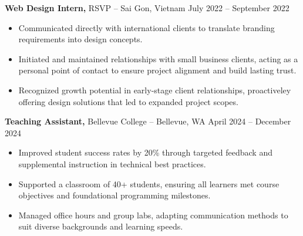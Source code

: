 \documentclass[11pt]{article}       %
\begin{document}
\textbf{Web Design Intern,} {RSVP} -- Sai Gon, Vietnam \hfill July 2022 -- September 2022 \\
\vspace{-9pt}
\begin{itemize}
  \item Communicated directly with international clients to translate branding requirements into design concepts.
  \item Initiated and maintained relationships with small business clients, acting as a personal point of contact to ensure project alignment and build lasting trust.
  \item Recognized growth potential in early-stage client relationships, proactiveley offering design solutions that led to expanded project scopes.
\end{itemize}

\textbf{Teaching Assistant,} {Bellevue College} -- Bellevue, WA \hfill April 2024 -- December 2024 \\
\vspace{-9pt}
\begin{itemize}
  \item Improved student success rates by 20\% through targeted feedback and supplemental instruction in technical best practices.
  \item Supported a classroom of 40+ students, ensuring all learners met course objectives and foundational programming milestones.
  \item Managed office hours and group labs, adapting communication methods to suit diverse backgrounds and learning speeds.
\end{itemize}

\end{document}

